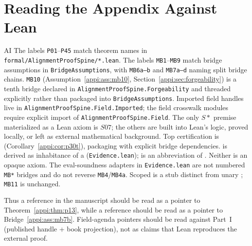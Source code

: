 \section{Reading the Appendix Against Lean}
\begin{authbar}{AI}
The labels \texttt{P01}--\texttt{P45} match theorem names in \texttt{formal/AlignmentProofSpine/*.lean}.
The labels \texttt{MB1}--\texttt{MB9} match bridge assumptions in \texttt{BridgeAssumptions}, with \texttt{MB6a--b} and \texttt{MB7a--d} naming split bridge chains. \texttt{MB10} (Assumption~\ref{appi:ass:mb10}, Section~\ref{appi:sec:forgeability}) is a tenth bridge declared in \texttt{AlignmentProofSpine.Forgeability} and threaded explicitly rather than packaged into \texttt{BridgeAssumptions}.
Imported field handles live in \texttt{AlignmentProofSpine.Field.Imported}; the field crosswalk modules require explicit import of \texttt{AlignmentProofSpine.Field}.
The only \(S*\) premise materialized as a Lean axiom is \(S07\); the others are built into Lean's logic, proved locally, or left as external mathematical background.
Top certification is  (Corollary~\ref{appi:cor:p30t}), packaging  with explicit bridge dependencies.
 is derived as inhabitance of a  (\texttt{Evidence.lean});  is an abbreviation of . Neither is an opaque axiom. The eval-soundness adapters in \texttt{Evidence.lean} are not numbered \texttt{MB*} bridges and do not reverse \texttt{MB4}/\texttt{MB4a}. Scoped  is a stub distinct from unary ; \texttt{MB11} is unchanged.

Thus a  reference in the manuscript should be read as a pointer to Theorem~\ref{appi:thm:p13}, while a  reference should be read as a pointer to Bridge~\ref{appi:ass:mb7b}.
Field-agenda pointers should be read against Part~I (published handle + book projection), not as claims that Lean reproduces the external proof.

\end{authbar}
\authbarsubneedspace
